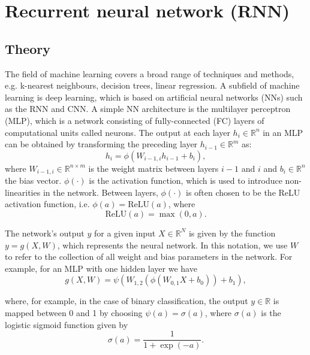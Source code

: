 
\section{Recurrent neural network (RNN)}

\subsection{Theory}

\noindent The field of machine learning covers a broad range of techniques and methods, e.g. k-nearest neighbours, decision trees, linear regression. A subfield of machine learning is deep learning, which is based on artificial neural networks (NNs) such as the RNN and CNN. A simple NN architecture is the multilayer perceptron (MLP), which is a network consisting of fully-connected (FC) layers of computational units called neurons. The output at each layer $h_{i} \in \mathbb{R}^{n}$ in an MLP can be obtained by transforming the preceding layer $h_{i-1} \in \mathbb{R}^{m}$ as:
\begin{equation}
    h_{i} = \phi(W_{i-1,i} h_{i-1} + b_{i}),
\end{equation}
where $W_{i-1,i} \in \mathbb{R}^{n \times m}$ is the weight matrix between layers $i-1$ and $i$ and $b_{i} \in \mathbb{R}^n$ the bias vector. $\phi(\cdot)$ is the activation function, which is used to introduce non-linearities in the network. Between layers, $\phi(\cdot)$ is often chosen to be the ReLU activation function, i.e. $\phi(a) = \text{ReLU}(a)$, where
\begin{equation}
    \text{ReLU}(a) = \max (0, a).
\end{equation}

The network's output $y$ for a given input $X \in \mathbb{R}^N$ is given by the function $y = g(X, W)$, which represents the neural network. In this notation, we use $W$ to refer to the collection of all weight and bias parameters in the network. For example, for an MLP with one hidden layer we have  
\begin{equation}
    \label{eq:mlp_function}
    g(X, W) = \psi(W_{1,2} (\phi(W_{0,1} X + b_{0})) + b_{1}),
\end{equation}

\noindent where, for example, in the case of binary classification, the output $y \in \mathbb{R}$ is mapped between 0 and 1 by choosing 
$\psi(a) = \sigma(a)$, where $\sigma(a)$ is the logistic sigmoid function given by
\begin{equation}
    \sigma(a) = \frac{1}{1+\exp(-a)}.
\end{equation}

